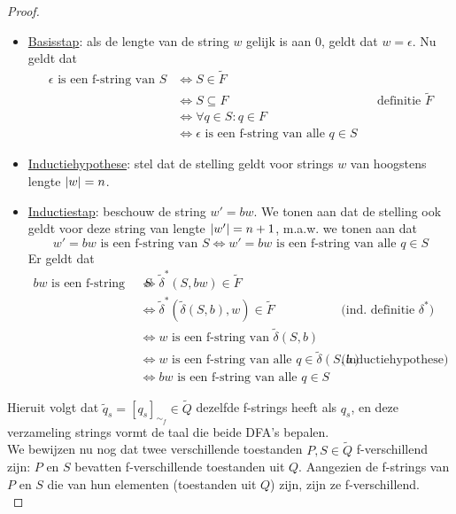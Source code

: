 \documentclass[../aanvullingen_cursus.tex]{subfiles}
\begin{document}
\begin{proof}
	\begin{itemize}
		\item \underline{Basisstap}: als de lengte van de string \(w\) gelijk is aan 0, geldt dat \(w=\epsilon\). Nu geldt dat
		\begin{align*}
				\epsilon \text{ is een f-string van } S &\Leftrightarrow S \in \tilde{F} \\
				&\Leftrightarrow S \subseteq F && \text{definitie } \tilde{F} \\
				&\Leftrightarrow \forall q \in S : q \in F \\
				&\Leftrightarrow \epsilon \text{ is een f-string van alle } q \in S
		\end{align*}
		\item \underline{Inductiehypothese}: stel dat de stelling geldt voor strings \(w\) van hoogstens lengte \(\lvert w \rvert=n\).
		\item \underline{Inductiestap}: beschouw de string \(w'=bw\). We tonen aan dat de stelling ook geldt voor deze string van lengte \(\lvert w' \rvert=n+1\), m.a.w. we tonen aan dat \[w'=bw \text{ is een f-string van } S \Leftrightarrow w'=bw \text{ is een f-string van alle } q\in S \]Er geldt dat
		\begin{align*}
			bw \text{ is een f-string van } S &\Leftrightarrow \tilde{\delta}^*(S,bw) \in \tilde{F} \\
			&\Leftrightarrow \tilde{\delta}^*\left(\tilde{\delta}(S,b),w\right) \in \tilde{F} && \text{(ind. definitie } \delta^*\text{)} \\
			&\Leftrightarrow w \text{ is een f-string van } \tilde{\delta}(S,b)\\
			&\Leftrightarrow w \text{ is een f-string van alle } q \in \tilde{\delta}(S,b) && \text{(inductiehypothese)} \\
			&\Leftrightarrow bw \text{ is een f-string van alle } q \in S
		\end{align*}
	\end{itemize}

	Hieruit volgt dat \(\tilde{q}_s = [q_s]_{\sim_f} \in \tilde{Q}\) dezelfde f-strings heeft als \(q_s\), en deze verzameling strings vormt de taal die beide DFA's bepalen.\\

	We bewijzen nu nog dat twee verschillende toestanden \(P,S \in \tilde{Q}\) f-verschillend zijn: \(P\) en \(S\) bevatten f-verschillende toestanden uit \(Q\). Aangezien de f-strings van \(P\) en \(S\) die van hun elementen (toestanden uit \(Q\)) zijn, zijn ze f-verschillend.\\

\end{proof}
\end{document}
